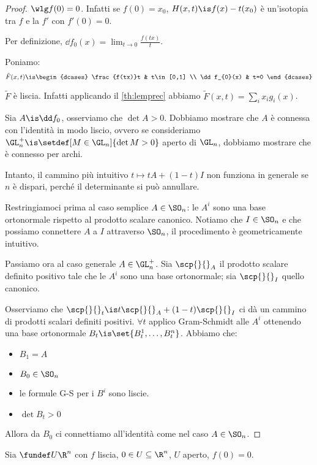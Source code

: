 \begin{proof}
	$\wlg f(0)=0$. Infatti se $f(0)=x_0$, $H(x,t)\is f(x)-t(x_0)$ è un'isotopia tra $f$ e la  $f'$ con $f'(0)=0$.
	
	Per definizione, $\dd f_{0}(x)=\lim_{t\to 0}\frac{f(tx)}t$.
	
	Poniamo:
	\[\tilde F(x,t)\is
	\begin{dcases}
		\frac{f(tx)}t & t\in[0,1] \\
		\dd f_{0}(x) & t=0
	\end{dcases}\]
	
	\claim $\tilde F$ è liscia. Infatti applicando il \autoref{th:lemprec} abbiamo $\tilde F(x,t)=\sum_ix_ig_i(x)$.
	
	Sia $A\is\dd f_{0}$, osserviamo che $\det A>0$.
	Dobbiamo mostrare che $A$ è connessa con l'identità in modo liscio, ovvero se consideriamo $\GL_n^+\is\setdef[M\in\GL_n]{\det M>0}$ aperto di $\GL_n$, dobbiamo mostrare che è connesso per archi.
	
	Intanto, il cammino più intuitivo $t\mapsto tA+(1-t)I$ non funziona in generale se $n$ è dispari, perché il determinante si può annullare.
	
	Restringiamoci prima al caso semplice $A\in\SO_n$: le $A^i$ sono una base ortonormale rispetto al prodotto scalare canonico. Notiamo che $I\in\SO_n$ e che possiamo connettere $A$ a $I$ attraverso $\SO_n$, il procedimento è geometricamente intuitivo.
	
	 Passiamo ora al caso generale $A\in\GL_n^+$. Sia $\scp{}{}_A$ il prodotto scalare definito positivo tale che le $A^i$ sono una base ortonormale; sia $\scp{}{}_I$ quello canonico.
	 
	 Osserviamo che $\scp{}{}_t\is t\scp{}{}_A+(1-t)\scp{}{}_I$ ci dà un cammino di prodotti scalari definiti positivi. $\forall t$ applico Gram-Schmidt alle $A^i$ ottenendo una base ortonormale $B_t\is\set{B_t^1,\dots,B_t^n}$. Abbiamo che:
	 \begin{itemize}
	 	\item $B_1=A$
		\item $B_0\in\SO_n$
		\item le formule G-S per i $B^i$ sono liscie.
		\item $\det B_t>0$
	 \end{itemize} 
	Allora da $B_0$ ci connettiamo all'identità come nel caso $A\in\SO_n$.
\end{proof}

Sia $\fundef U{\R^n}$ con $f$ liscia, $0\in U\subseteq\R^n$, $U$ aperto, $f(0)=0$.

